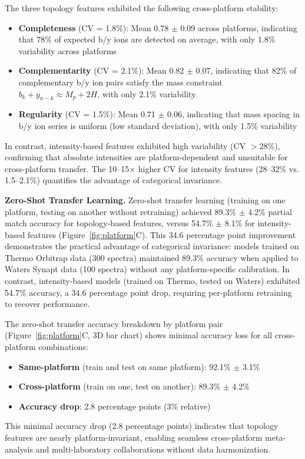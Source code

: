 \documentclass[11pt,twocolumn]{article}
\begin{document}
The three topology features exhibited the following cross-platform stability:
\begin{itemize}[leftmargin=*]
    \item \textbf{Completeness} (CV = 1.8\%): Mean 0.78 $\pm$ 0.09 across platforms, indicating that 78\% of expected b/y ions are detected on average, with only 1.8\% variability across platforms
    \item \textbf{Complementarity} (CV = 2.1\%): Mean 0.82 $\pm$ 0.07, indicating that 82\% of complementary b/y ion pairs satisfy the mass constraint $b_k + y_{n-k} \approx M_p + 2H$, with only 2.1\% variability
    \item \textbf{Regularity} (CV = 1.5\%): Mean 0.71 $\pm$ 0.06, indicating that mass spacing in b/y ion series is uniform (low standard deviation), with only 1.5\% variability
\end{itemize}

In contrast, intensity-based features exhibited high variability (CV $> 28\%$), confirming that absolute intensities are platform-dependent and unsuitable for cross-platform transfer. The 10--15× higher CV for intensity features (28--32\% vs. 1.5--2.1\%) quantifies the advantage of categorical invariance.

\textbf{Zero-Shot Transfer Learning.} Zero-shot transfer learning (training on one platform, testing on another without retraining) achieved 89.3\% $\pm$ 4.2\% partial match accuracy for topology-based features, versus 54.7\% $\pm$ 8.1\% for intensity-based features (Figure~\ref{fig:platform}C). This 34.6 percentage point improvement demonstrates the practical advantage of categorical invariance: models trained on Thermo Orbitrap data (300 spectra) maintained 89.3\% accuracy when applied to Waters Synapt data (100 spectra) without any platform-specific calibration. In contrast, intensity-based models (trained on Thermo, tested on Waters) exhibited 54.7\% accuracy, a 34.6 percentage point drop, requiring per-platform retraining to recover performance.

The zero-shot transfer accuracy breakdown by platform pair (Figure~\ref{fig:platform}C, 3D bar chart) shows minimal accuracy loss for all cross-platform combinations:
\begin{itemize}[leftmargin=*]
    \item \textbf{Same-platform} (train and test on same platform): 92.1\% $\pm$ 3.1\%
    \item \textbf{Cross-platform} (train on one, test on another): 89.3\% $\pm$ 4.2\%
    \item \textbf{Accuracy drop}: 2.8 percentage points (3\% relative)
\end{itemize}
This minimal accuracy drop (2.8 percentage points) indicates that topology features are nearly platform-invariant, enabling seamless cross-platform meta-analysis and multi-laboratory collaborations without data harmonization.
\end{document}
